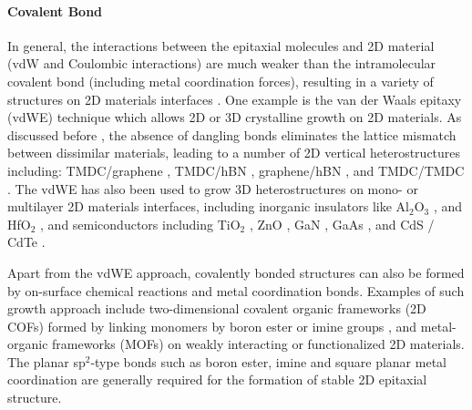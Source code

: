 \paragraph{Covalent Bond}
In general, the interactions between the epitaxial molecules and 2D
material (vdW and Coulombic interactions) are much weaker than the
intra\-molecular covalent bond (including metal coordination forces),
resulting in a variety of structures on 2D materials interfaces
\cite{Bakti_Utama_2013_rev_epitax}. One example is the van der Waals
epitaxy (vdWE) technique which allows 2D or 3D crystalline growth on
2D materials. As discussed before , the
absence of dangling bonds eliminates the lattice mismatch between
dissimilar materials, leading to a number of 2D vertical
heterostructures including: TMDC/graphene
\cite{Shi_2012_vdw_epi_MoS2_gr,Liu_2016_epi_MoS2_gr_rotation,Lin_2014_vdW_solid,Lin_2015_Wse2_MoS2_gr,Azizi_2015_Freevdw_Gr_TMDCs,Kim_2016_BiSnTe_gr},
TMDC/hBN
\cite{Yan_2015_MoS2_on_hBN,Wang_2015_cvd_MoS2_BN,Cattelan_2015_Ws2_hBN},
graphene/hBN
\cite{Liu_2011_gr_hBN,Zhang_2015_gr_hBN,Driver_2016_MBE_gr_hBN}, and
TMDC/TMDC
\cite{Zhang_2014_vdw_epi_SnS2_MoS2,Diaz_2015_MoTe2_MoSe2,Gong_2014_WS2_MoS2,Alemayehu_2015_TMDC_vdw}.
%
The vdWE has also been used to grow 3D heterostructures on mono- or
multilayer 2D materials interfaces, including inorganic insulators like Al\(_{\text{2}}\)O\(_{\text{3}}\)
\cite{Zhang_2014_Al2O3_ALO_Gr,Vaziri_2013_ALD_Al2O3_gr}, and
HfO\(_{\text{2}}\) \cite{Alaboson_2011_PTCDA_gr_ALD},
%
and semiconductors including TiO\(_{\text{2}}\)
\cite{Li_2015_TiO2_GO,Kumar_2011_gr_TiO2_generator,Zhang_2011_TiO2_gr},
ZnO \cite{Chung_2010_GaN_ZnO_gr,Oh_2014_ZnO_hBN}, GaN
\cite{Kobayashi_2012_GaN_hBN,Kim_2014_direct_vdw_GaN_gr,Kim_2017_remote_epi_Gr},
GaAs \cite{Alaskar_2015_GaAs_gr_Si_theor,Kim_2017_remote_epi_Gr}
, and CdS / CdTe
\cite{Loeher_1994_vdw_epi_CdS_MoTe,Loeher_1996_CdTe_MoWTe}.

Apart from the vdWE approach, covalently bonded structures can also be
formed by on-surface chemical reactions and metal coordination
bonds. Examples of such growth approach include two-dimensional covalent organic frameworks (2D COFs) formed by linking monomers by boron ester
or imine groups
\cite{Colson_2014_2D_COF_gr,Colson_2011_2DMOF_gr,Sun_2017_cof_gr}, and metal-organic frameworks (MOFs) \cite{Urgel_2015_MOF_BN,Kumar_2014_2D_MOF_gr} on weakly interacting or
functionalized 2D materials. The planar sp$^{2}$-type bonds
such as boron ester, imine and square planar metal coordination are
generally required for the formation of stable 2D epitaxial structure.

